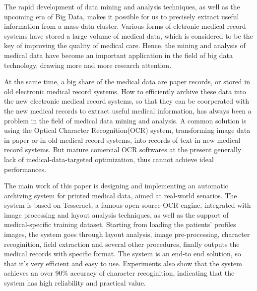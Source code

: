 \begin{enabstract}
The rapid development of data mining and analysis techniques, as well as the upcoming era of Big Data, makes it possible for us to precisely extract useful information from a mass data cluster.
Various forms of eletronic medical record systems have stored a large volume of medical data, which is considered to be the key of improving the quality of medical care.
Hence, the mining and analysis of medical data have become an important application in the field of big data technology, drawing more and more research attention.

At the same time, a big share of the medical data are paper records, or stored in old electronic medical record systems.
How to efficiently archive these data into the new electronic medical record systems, so that they can be coorperated with the new medical records to extract useful medical information, has always been a problem in the field of medical data mining and analysis.
A common solution is using the Optical Character Recognition(OCR) system, transforming image data in paper or in old medical record systems, into records of text in new medical record systems.
But mature comercial OCR softwares at the present generally lack of medical-data-targeted optimization, thus cannot achieve ideal performances.

The main work of this paper is designing and implementing an automatic archiving system for printed medical data, aimed at real-world senarios.
The system is based on Tesseract, a famous open-source OCR engine, integrated with image processing and layout analysis techniques, as well as the support of medical-specific training dataset.
Starting from loading the patients' profiles images, the system goes through layout analysis, image pre-processing, character recoginition, field extraction and several other procedures, finally outputs the medical records with specific format.
The system is an end-to end solution, so that it's very efficient and easy to use.
Experiments also show that the system achieves an over 90\% accuracy of character recoginition, indicating that the system has high reliability and practical value.

\end{enabstract}
